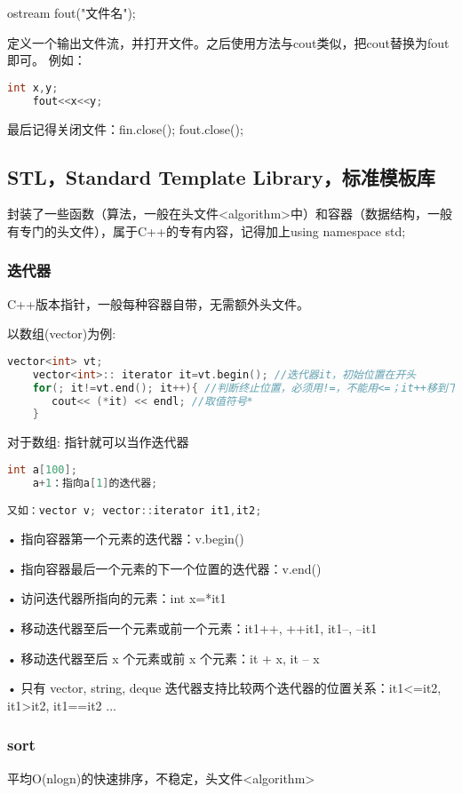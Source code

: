 \documentclass[UTF8]{ctexart}
\begin{document}
ostream fout("文件名");

定义一个输出文件流，并打开文件。之后使用方法与cout类似，把cout替换为fout即可。
例如：
\begin{lstlisting}[language = C,basicstyle=\small\ttfamily]
    int x,y;
    fout<<x<<y;
\end{lstlisting}
最后记得关闭文件：fin.close(); fout.close();
\subsection{STL，Standard Template Library，标准模板库}
封装了一些函数（算法，一般在头文件<algorithm>中）和容器（数据结构，一般有专门的头文件），属于C++的专有内容，记得加上using namespace std;
\subsubsection{迭代器}
C++版本指针，一般每种容器自带，无需额外头文件。

以数组(vector)为例:
\begin{lstlisting}[language = C,basicstyle=\small\ttfamily]
    vector<int> vt;
    vector<int>:: iterator it=vt.begin(); //迭代器it，初始位置在开头
    for(; it!=vt.end(); it++){ //判断终止位置，必须用!=，不能用<=；it++移到下一位置
	   cout<< (*it) << endl; //取值符号*
    }
\end{lstlisting}
对于数组: 指针就可以当作迭代器
\begin{lstlisting}[language = C,basicstyle=\small\ttfamily]
    int a[100];
    a+1：指向a[1]的迭代器;

又如：vector v; vector::iterator it1,it2;
\end{lstlisting}

• 指向容器第一个元素的迭代器：v.begin() 

• 指向容器最后一个元素的下一个位置的迭代器：v.end() 

• 访问迭代器所指向的元素：int x=*it1 

• 移动迭代器至后一个元素或前一个元素：it1++, ++it1, it1--, --it1 

• 移动迭代器至后 x 个元素或前 x 个元素：it + x, it – x 

• 只有 vector, string, deque 迭代器支持比较两个迭代器的位置关系：it1<=it2, it1>it2, it1==it2 ...

\subsubsection{sort}
平均O(nlogn)的快速排序，不稳定，头文件<algorithm>
\end{document}
